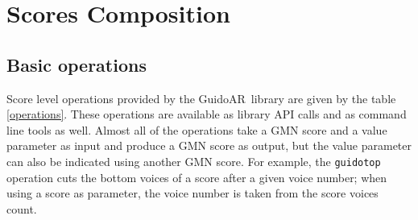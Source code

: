 \documentclass{article}
\newcommand{\GAR}		{GuidoAR}
\newcommand{\code}[1]	{{\small \texttt{#1}}}
\begin{document}
\section{Scores Composition}

\subsection{Basic operations}
Score level operations provided by the \GAR\ library are given by the table \ref{operations}. These operations are available as library API calls and as command line tools as well. Almost all of the operations take a GMN score and a value parameter as input and produce a GMN score as output, but the value parameter can also be indicated using another GMN score.
For example, the \code{guidotop} operation cuts the bottom voices of a score after a given voice number; when using a score as parameter, the voice number is taken from the score voices count.
\end{document}
